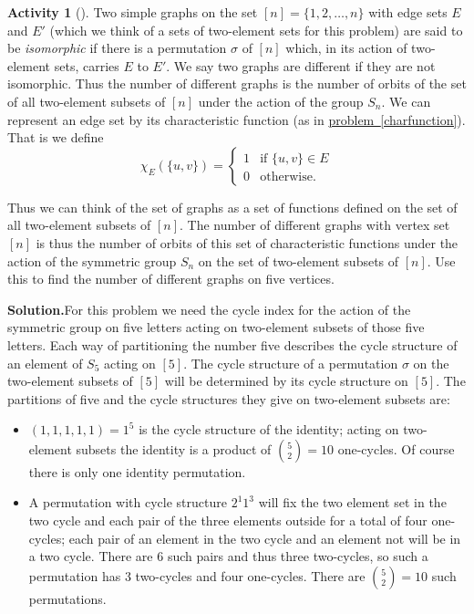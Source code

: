 \documentclass[10pt,]{book}
\theoremstyle{plain}
\theoremstyle{definition}
\newtheorem{activity}[project]{Activity}
\numberwithin{equation}{chapter}
\newcommand{\amp}{&}
\begin{document}
\begin{activity}[]\label{activity-333}
Two simple graphs on the set \([n]= \{1,2,\ldots, n\}\) with edge sets \(E\) and \(E'\) (which we think of a sets of two-element sets for this problem) are said to be \emph{isomorphic} if there is a permutation \(\sigma\) of \([n]\) which, in its action of two-element sets, carries \(E\) to \(E'\). We say two graphs are different if they are not isomorphic. Thus the number of different graphs is the number of orbits of the set of all two-element subsets of \([n]\) under the action of the group \(S_n\). We can represent an edge set by its characteristic function (as in \hyperref[charfunction]{problem~\ref{charfunction}}). That is we define%
\begin{equation*}
\chi_E(\{u,v\}) = \left\{
\begin{array}{ll}
1 \amp  \mbox{if \(\{u,v\}\in E\)} \\
0 \amp  \mbox{otherwise.}
\end{array} \right.
\end{equation*}
%
\par
Thus we can think of the set of graphs as a set of functions defined on the set of all two-element subsets of \([n]\). The number of different graphs with vertex set \([n]\) is thus the number of orbits of this set of characteristic functions under the action of the symmetric group \(S_n\) on the set of two-element subsets of \([n]\). Use this to find the number of different graphs on five vertices.%
\par\medskip\noindent%
\textbf{Solution.}\quad For this problem we need the cycle index for the action of the symmetric group on five letters acting on two-element subsets of those five letters. Each way of partitioning the number five describes the cycle structure of an element of \(S_5\) acting on \([5]\). The cycle structure of a permutation \(\sigma\) on the two-element subsets of \([5]\) will be determined by its cycle structure on \([5]\). The partitions of five and the cycle structures they give on two-element subsets are:%
\leavevmode%
\begin{itemize}[label=\textbullet]
\item{}\((1,1,1,1,1) =1^5\) is the cycle structure of the identity; acting on two-element subsets the identity is a product of \(\binom{5}{2}=10\) one-cycles.  Of course there is only one identity permutation.%
\item{}A permutation with cycle structure \(2^1 1^3\) will fix the two element set in the two cycle and each pair of the three elements outside for a total of four one-cycles; each pair of an element in the two cycle and an element not will be in a two cycle.  There are 6 such pairs and thus three two-cycles, so such a permutation has 3 two-cycles and four one-cycles.  There are \(\binom{5}{2}=10\) such permutations.%

\end{itemize}
\end{activity}
\end{document}
